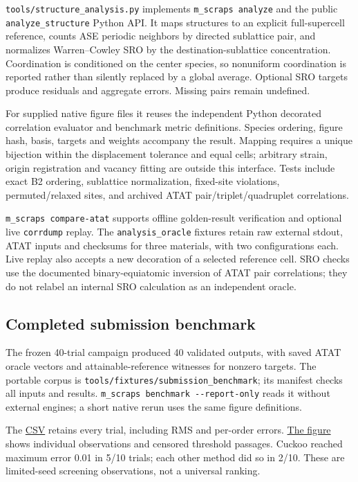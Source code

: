 \documentclass[
  11pt,
]{article}
\begin{document}
\texttt{tools/structure\_analysis.py} implements
\texttt{m\_scraps\ analyze} and the public \texttt{analyze\_structure}
Python API. It maps structures to an explicit full-supercell reference,
counts ASE periodic neighbors by directed sublattice pair, and
normalizes Warren--Cowley SRO by the destination-sublattice
concentration. Coordination is conditioned on the center species, so
nonuniform coordination is reported rather than silently replaced by a
global average. Optional SRO targets produce residuals and aggregate
errors. Missing pairs remain undefined.

For supplied native figure files it reuses the independent Python
decorated correlation evaluator and benchmark metric definitions.
Species ordering, figure hash, basis, targets and weights accompany the
result. Mapping requires a unique bijection within the displacement
tolerance and equal cells; arbitrary strain, origin registration and
vacancy fitting are outside this interface. Tests include exact B2
ordering, sublattice normalization, fixed-site violations,
permuted/relaxed sites, and archived ATAT pair/triplet/quadruplet
correlations.

\texttt{m\_scraps\ compare-atat} supports offline golden-result
verification and optional live \texttt{corrdump} replay. The
\texttt{analysis\_oracle} fixtures retain raw external stdout, ATAT
inputs and checksums for three materials, with two configurations each.
Live replay also accepts a new decoration of a selected reference cell.
SRO checks use the documented binary-equiatomic inversion of ATAT pair
correlations; they do not relabel an internal SRO calculation as an
independent oracle.

\subsection{Completed submission
benchmark}\label{completed-submission-benchmark}

The frozen 40-trial campaign produced 40 validated outputs, with saved
ATAT oracle vectors and attainable-reference witnesses for nonzero
targets. The portable corpus is
\texttt{tools/fixtures/submission\_benchmark}; its manifest checks all
inputs and results. \texttt{m\_scraps\ benchmark\ -\/-report-only} reads
it without external engines; a short native rerun uses the same figure
definitions.

The \href{submission_benchmark.csv}{CSV} retains every trial, including
RMS and per-order errors. \href{submission_benchmark.png}{The figure}
shows individual observations and censored threshold passages. Cuckoo
reached maximum error 0.01 in 5/10 trials; each other method did so in
2/10. These are limited-seed screening observations, not a universal
ranking.
\end{document}

